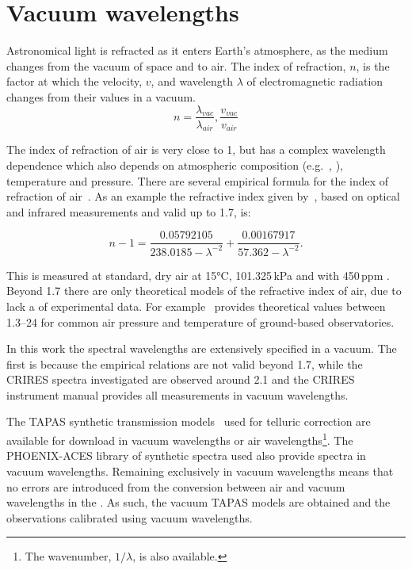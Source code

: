 
\chapter{Vacuum wavelengths}
Astronomical light is refracted as it enters Earth's atmosphere, as the medium changes from the vacuum of space and to air.
The index of refraction, \(n\), is the factor at which the velocity, \(v\), and wavelength \(\lambda\) of electromagnetic radiation changes from their values in a vacuum.
\begin{equation}
n  = \frac{\lambda_{vac}}{\lambda_{air}}, \frac{v_{vac}}{v_{air}}
\end{equation}

The index of refraction of air is very close to 1, but has a complex wavelength dependence which also depends on atmospheric composition (e.g.\ , ), temperature and pressure.
There are several empirical formula for the index of refraction of air~\citep[e.g.][]{edlen_dispersion_1953, peck_dispersion_1972, ciddor_refractive_1996}.
As an example the refractive index given by~\citet{ciddor_refractive_1996}, based on optical and infrared measurements and valid up to 1.7\um{}, is:

\begin{equation}
    n -1 = \frac{0.05792105}{238.0185 - \lambda^{-2}} + \frac{0.00167917}{57.362 - \lambda^{-2}}.
\end{equation}

This is measured at standard, dry air at 15\si{\degreeCelsius}, 101.325\,\si{\kilo\pascal} and with 450\,ppm .
Beyond 1.7\um{} there are only theoretical models of the refractive index of air, due to lack a of experimental data.
For example~\citet{mathar_refractive_2007} provides theoretical values between 1.3--24\um{} for common air pressure and temperature of ground-based observatories.

In this work the spectral wavelengths are extensively specified in a vacuum.
The first is because the empirical relations are not valid beyond 1.7\um{}, while the {CRIRES} spectra investigated are observed around 2.1\um{} and the {CRIRES} instrument manual provides all measurements in vacuum wavelengths.

The {TAPAS} synthetic transmission models~\citet{bertaux_tapas_2014} used for telluric correction are available for download in vacuum wavelengths or air wavelengths\footnote{The wavenumber, \(1/\lambda\), is also available.}.
The {PHOENIX-ACES} library of synthetic spectra used also provide spectra in vacuum wavelengths.
Remaining exclusively in vacuum wavelengths means that no errors are introduced from the conversion between air and vacuum wavelengths in the \nir{}.
As such, the vacuum {TAPAS} models are obtained and the observations calibrated using vacuum wavelengths.
